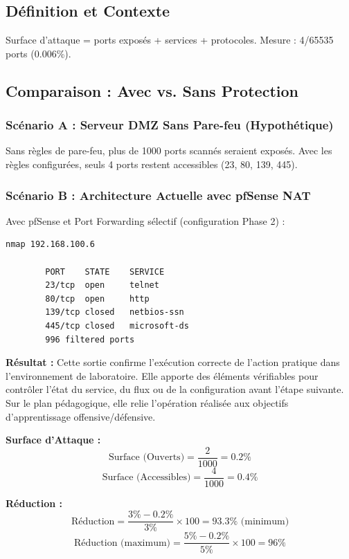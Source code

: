 \documentclass[12pt,a4paper,openany]{report}
\begin{document}
	\subsection{Définition et Contexte}
	Surface d'attaque = ports exposés + services + protocoles. Mesure : 4/65535 ports (0.006\%).
	
	\subsection{Comparaison : Avec vs. Sans Protection}
	
	\subsubsection{Scénario A : Serveur DMZ Sans Pare-feu (Hypothétique)}
	Sans règles de pare-feu, plus de 1000 ports scannés seraient exposés. Avec les règles configurées, seuls 4 ports restent accessibles (23, 80, 139, 445).
	
	\subsubsection{Scénario B : Architecture Actuelle avec pfSense NAT}
	Avec pfSense et Port Forwarding sélectif (configuration Phase 2) :
	
	\begin{lstlisting}[caption=Scan Nmap réel avec pfSense]
		nmap 192.168.100.6
		
		PORT    STATE    SERVICE
		23/tcp  open     telnet
		80/tcp  open     http
		139/tcp closed   netbios-ssn
		445/tcp closed   microsoft-ds
		996 filtered ports
	\end{lstlisting}
	
	\textbf{Résultat :} Cette sortie confirme l'exécution correcte de l'action pratique dans l'environnement de laboratoire. Elle apporte des éléments vérifiables pour contrôler l'état du service, du flux ou de la configuration avant l'étape suivante. Sur le plan pédagogique, elle relie l'opération réalisée aux objectifs d'apprentissage offensive/défensive.
	
	
	\textbf{Surface d'Attaque :}
	\[
	\text{Surface (Ouverts)} = \frac{2}{1000} = 0.2\%
	\]
	\[
	\text{Surface (Accessibles)} = \frac{4}{1000} = 0.4\%
	\]
	
	\textbf{Réduction :}
	\[
	\text{Réduction} = \frac{3\% - 0.2\%}{3\%} \times 100 = 93.3\% \text{ (minimum)}
	\]
	\[
	\text{Réduction (maximum)} = \frac{5\% - 0.2\%}{5\%} \times 100 = 96\%
	\]
	
\end{document}
